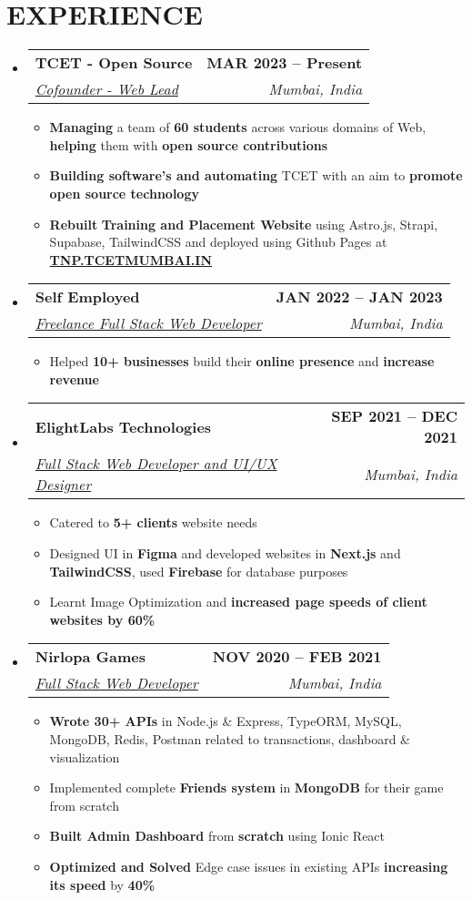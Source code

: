 \documentclass{article}
\makeatletter
\newcommand{\resumeItem}[1]{
  \item\small{
    {#1 \vspace{-2pt}}
  }
}
\newcommand{\resumeSubheading}[4]{
  \vspace{-2pt}\item
    \begin{tabular*}{1.0\textwidth}[t]{l@{\extracolsep{\fill}}r}
      \textbf{\large#1} & \textbf{\small #2} \\
      \textit{\large#3} & \textit{\small #4} \\
      
    \end{tabular*}\vspace{-7pt}
}
\newcommand{\resumeSubHeadingListStart}{\begin{itemize}[leftmargin=0.0in, label={}]}
\newcommand{\resumeSubHeadingListEnd}{\end{itemize}}
\newcommand{\resumeItemListStart}{\begin{itemize}}
\newcommand{\resumeItemListEnd}{\end{itemize}\vspace{-5pt}}
\makeatother
\begin{document}
\section{EXPERIENCE}
  \resumeSubHeadingListStart

    \resumeSubheading
      {TCET - Open Source \href{https://opensource.tcetmumbai.in/}{\raisebox{-0.1\height}\faExternalLink }  \href{https://github.com/tcet-opensource/}{\raisebox{-0.1\height}\faGithub}}{MAR 2023 -- Present} 
      {\underline{Cofounder - Web Lead}}{Mumbai, India}
      \resumeItemListStart
        \resumeItem{\normalsize{\textbf{Managing} a team of \textbf{60 students} across various domains of Web, \textbf{helping} them with \textbf{open source contributions}}}\resumeItem{\normalsize{\textbf{Building software's and automating} TCET with an aim to \textbf{promote open source technology}  }}
        \resumeItem{\normalsize{\textbf{Rebuilt} \textbf{Training and Placement Website} using Astro.js, Strapi, Supabase, TailwindCSS and deployed using Github Pages at \href{https://tnp.tcetmumbai.in}{\textbf{TNP.TCETMUMBAI.IN}}  }}
  
      \resumeItemListEnd
    \resumeSubheading
      {Self Employed \href{certificate Link}{\raisebox{-0.1\height}}}{JAN 2022 -- JAN 2023} 
      {\underline{Freelance Full Stack Web Developer}}{Mumbai, India}
      \resumeItemListStart
        \resumeItem{\normalsize{Helped \textbf{10+ businesses} build their \textbf{online presence} and \textbf{increase revenue} }}
  
      \resumeItemListEnd
    \resumeSubheading
      {ElightLabs Technologies \href{https://elightlabs.com/}{\raisebox{-0.1\height}\faExternalLink}}{SEP 2021 -- DEC 2021} 
      {\underline{Full Stack Web Developer and UI/UX Designer}}{Mumbai, India}
      \resumeItemListStart
        \resumeItem{\normalsize{Catered to \textbf{5+ clients} website needs }}
         \resumeItem{\normalsize{Designed UI in \textbf{Figma} and developed websites in \textbf{Next.js} and \textbf{TailwindCSS}, used \textbf{Firebase} for database purposes }}
         \resumeItem{\normalsize{Learnt Image Optimization and \textbf{increased page speeds of client websites by 60\%}}}
      \resumeItemListEnd
  \resumeSubheading
      {Nirlopa Games \href{https://nirlopagames.com/}{\raisebox{-0.1\height}\faExternalLink}}{NOV 2020 -- FEB 2021} 
      {\underline{Full Stack Web Developer}}{Mumbai, India}
      \resumeItemListStart
        \resumeItem{\normalsize{\textbf{Wrote 30+ APIs }in Node.js & Express, TypeORM, MySQL, MongoDB, Redis, Postman related to transactions, dashboard & visualization}}
         \resumeItem{\normalsize{Implemented complete \textbf{Friends system} in \textbf{MongoDB} for their game from scratch }}
         \resumeItem{\normalsize{\textbf{Built Admin Dashboard} from \textbf{scratch} using Ionic React}}
         \resumeItem{\normalsize{ \textbf{Optimized and Solved }Edge case issues in existing APIs \textbf{increasing its speed} by \textbf{40\%} }}
      \resumeItemListEnd
  \resumeSubHeadingListEnd
\vspace{-12pt}
\end{document}
